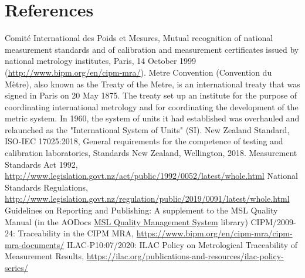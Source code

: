 \section{References}

\begingroup
\renewcommand{\section}[2]{}%

\begin{thebibliography}{9}
 Comit\'e International des Poids et Mesures, Mutual recognition of national measurement standards and of calibration and measurement certificates issued by national metrology institutes, Paris, 14 October 1999 (\url{http://www.bipm.org/en/cipm-mra/}).
 Metre Convention (Convention du M\`etre), also known as the Treaty of the Metre, is an international treaty that was signed in Paris on 20 May 1875. The treaty set up an institute for the purpose of coordinating international metrology and for coordinating the development of the metric system. In 1960, the system of units it had established was overhauled and relaunched as the "International System of Units" (SI).
 New Zealand Standard, ISO-IEC 17025:2018, General requirements for the competence of testing and calibration laboratories, Standards New Zealand, Wellington, 2018.
 {Measurement Standards Act 1992}, \url{http://www.legislation.govt.nz/act/public/1992/0052/latest/whole.html}
 {National Standards Regulations}, \url{http://www.legislation.govt.nz/regulation/public/2019/0091/latest/whole.html}
 Guidelines on Reporting and Publishing: A supplement to the MSL Quality Manual (in the AODocs \href{https://aodocs.altirnao.com/?locale=en_NZ&aodocs-domain=callaghaninnovation.govt.nz#Menu_listDoc/LibraryId_SkJpYFA1uuD6N1jOV1/ViewId_SkJpcBbvZJa1IRko5Y/ViewParams_%257B%2522searchInSubFolders%2522:false,%2522userFilters%2522:%255B%257B%2522property%2522:%2522folder%2522,%2522operator%2522:%2522EQUAL%2522,%2522values%2522:%255B%25221r8UkK6gfEQ0VWsPOd9wLbWm0oamnYQok%2522%255D%257D%255D%257D}{MSL Quality Management System} library)
 {CIPM/2009-24: Traceability in the CIPM MRA}, \url{https://www.bipm.org/en/cipm-mra/cipm-mra-documents/}
 {ILAC-P10:07/2020: ILAC Policy on Metrological Traceability of Measurement Results}, \url{https://ilac.org/publications-and-resources/ilac-policy-series/}
\end{thebibliography}

\endgroup